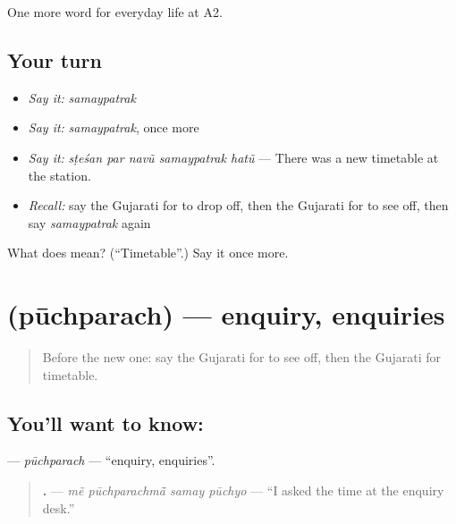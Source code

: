 \begin{grammarlens}[title={What you've built}]
One more word for everyday life at A2.
\end{grammarlens}

\subsection*{Your turn}
\begin{itemize}
\raggedright
  \item \emph{Say it:} \emph{samaypatrak}
  \item \emph{Say it:} \emph{samaypatrak}, once more
  \item \emph{Say it:} \emph{sṭeśan par navũ samaypatrak hatũ} — There was a new timetable at the station.
  \item \emph{Recall:} say the Gujarati for to drop off, then the Gujarati for to see off, then say \emph{samaypatrak} again
\end{itemize}

\begin{tcolorbox}[breakable,colback=teal!4,colframe=teal!35!black,title={Before you move on}]
What does  mean? (\textquotedblleft{}Timetable\textquotedblright{}.) Say it once more.
\end{tcolorbox}
\section[\texorpdfstring{\gu{પૂછપરછ} (pūchparach)}{પૂછપરછ (pūchparach)}]{ (pūchparach) — enquiry, enquiries}

\label{lesson:GU-C204-puchparach}



\begin{quote}
Before the new one: say the Gujarati for to see off, then the Gujarati for timetable.
\end{quote}

\subsection*{You'll want to know: }
\textbf{} — \emph{pūchparach} — \textquotedblleft{}enquiry, enquiries\textquotedblright{}.

\begin{quote}
\textbf{   .} — \emph{mẽ pūchparachmā̃ samay pūchyo} — \textquotedblleft{}I asked the time at the enquiry desk.\textquotedblright{}
\end{quote}


